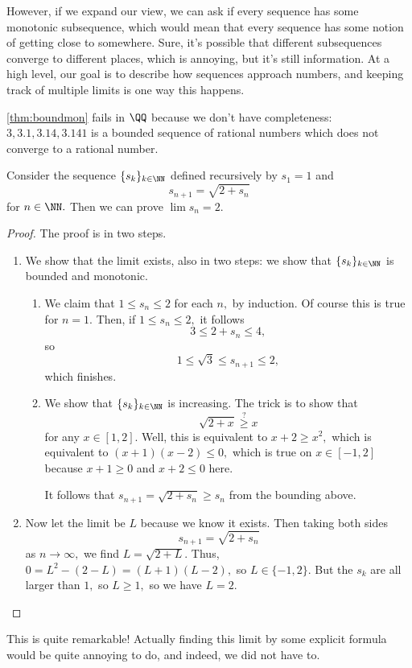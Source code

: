\documentclass[../notes.tex]{subfiles}
\begin{document}
However, if we expand our view, we can ask if every sequence has some monotonic subsequence, which would mean that every sequence has some notion of getting close to somewhere. Sure, it's possible that different subsequences converge to different places, which is annoying, but it's still information. At a high level, our goal is to describe how sequences approach numbers, and keeping track of multiple limits is one way this happens.
\begin{remark}
	\autoref{thm:boundmon} fails in $\QQ$ because we don't have completeness: $3,3.1,3.14,3.141$ is a bounded sequence of rational numbers which does not converge to a rational number.
\end{remark}
\begin{exercise}
	Consider the sequence $\{s_k\}_{k\in\NN}$ defined recursively by $s_1=1$ and
	\[s_{n+1}=\sqrt{2+s_n}\]
	for $n\in\NN.$ Then we can prove $\lim s_n=2.$
\end{exercise}
\begin{proof}
	The proof is in two steps.
	\begin{enumerate}
		\item We show that the limit exists, also in two steps: we show that $\{s_k\}_{k\in\NN}$ is bounded and monotonic.
		\begin{enumerate}
			\item We claim that $1\le s_n\le 2$ for each $n,$ by induction. Of course this is true for $n=1.$ Then, if $1\le s_n\le 2,$ it follows
			\[3\le2+s_n\le4,\]
			so
			\[1\le\sqrt3\le s_{n+1}\le2,\]
			which finishes.
			\item We show that $\{s_k\}_{k\in\NN}$ is increasing. The trick is to show that
			\[\sqrt{2+x}\stackrel?\ge x\]
			for any $x\in[1,2].$ Well, this is equivalent to $x+2\ge x^2,$ which is equivalent to $(x+1)(x-2)\le0,$ which is true on $x\in[-1,2]$ because $x+1\ge0$ and $x+2\le0$ here.

			It follows that $s_{n+1}=\sqrt{2+s_n}\ge s_n$ from the bounding above.
		\end{enumerate}
		\item Now let the limit be $L$ because we know it exists. Then taking both sides
		\[s_{n+1}=\sqrt{2+s_n}\]
		as $n\to\infty,$ we find $L=\sqrt{2+L}.$ Thus, $0=L^2-(2-L)=(L+1)(L-2),$ so $L\in\{-1,2\}.$ But the $s_k$ are all larger than $1,$ so $L\ge1,$ so we have $\boxed{L=2}.$
		\qedhere
	\end{enumerate}
\end{proof}
\begin{remark}
	This is quite remarkable! Actually finding this limit by some explicit formula would be quite annoying to do, and indeed, we did not have to.
\end{remark}
\end{document}
